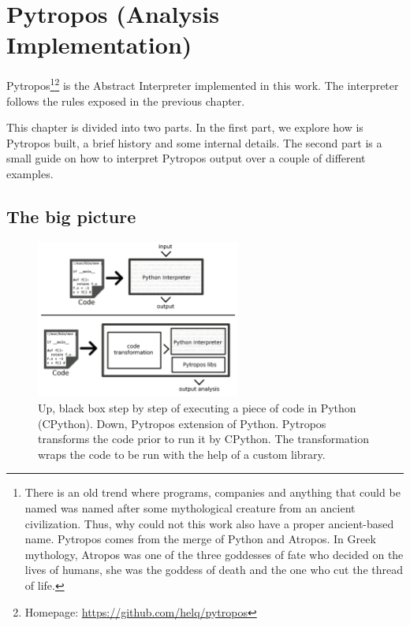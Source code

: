 \chapter{Pytropos (Analysis Implementation)}%
\label{pytropos-analysis-implementation}

Pytropos\footnote{There is an old trend where programs, companies and
  anything that could be named was named after some mythological
  creature from an ancient civilization. Thus, why could not this work
  also have a proper ancient-based name. Pytropos comes from the merge
  of Python and Atropos. In Greek mythology, Atropos was one of the
  three goddesses of fate who decided on the lives of humans, she was
  the goddess of death and the one who cut the thread of life.}\footnote{
  Homepage: \url{https://github.com/helq/pytropos}
} is the
Abstract Interpreter implemented in this work. The interpreter follows
the rules exposed in the previous chapter.

This chapter is divided into two parts. In the first part, we explore
how is Pytropos built, a brief history and some internal details. The
second part is a small guide on how to interpret Pytropos output over a
couple of different examples.

\section{The big picture}\label{the-big-picture}

\begin{figure}
\begin{center}
  \includegraphics[width=0.6\textwidth]{figures/pytroposimage.png}
\end{center}
\caption{Up, black box step by step of executing a piece of code in Python (CPython). Down,
  Pytropos extension of Python. Pytropos transforms the code prior to run it by CPython.
  The transformation wraps the code to be run with the help of a custom library.
  \label{pytroposinter}}
\end{figure}

